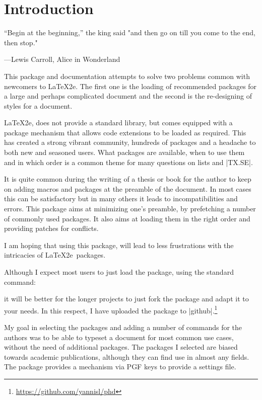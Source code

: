 \makeatletter\@specialfalse\makeatother
{}
\chapter{Introduction}


\epigraph{``Begin at the beginning,'' the king said
"and then go on till you come to the end, then stop."}{
---Lewis Carroll, Alice in Wonderland}

\minitoc

This package and documentation attempts to solve two problems common with
newcomers to \LaTeX2e. The first one is the loading of recommended packages for a large and perhaps complicated document and the second is the re-designing of styles for a document.

 \LaTeX2e, does not provide a standard library, but comes equipped with
 a package mechanism that allows code extensions to be loaded as required.
 This has created a strong vibrant community, hundreds of packages and a 
 headache to both new and seasoned users. What packages are available, when
 to use them and in which order is a common theme for many questions on
 lists and |TX.SE|.

 It is quite common during the writing of a thesis or book
 for the author to keep on adding macros and packages
 at the preamble of the document. In most cases this can
 be satisfactory but in many others it leads to
 incompatibilities and errors. This package aims at
 minimizing one's preamble, by prefetching a number of
 commonly used packages. It also aims at loading them
 in the right order and providing patches for conflicts.
 
 I am hoping that using this package, will lead to less
 frustrations with the intricacies of \LaTeX2e\ packages.

 Although I expect most users to just load the package, using
 the standard command:

 \begin{teX}
  \usepackage{phd}
 \end{teX}

 it will be better for the longer projects to just fork the
 package and adapt it to your needs. In this respect, I have
 uploaded the package to |github|.\footnote{\url{https://github.com/yannisl/phd}}

 My goal in selecting the packages and adding a number of 
 commands for the authors was to be able to typeset a 
 document for most common use cases, without the need of
 additional packages. The packages I selected are biased
 towards academic publications, although they can find use
 in almost any fields. The package provides a mechanism via
 PGF keys to provide a settings file. 
 
